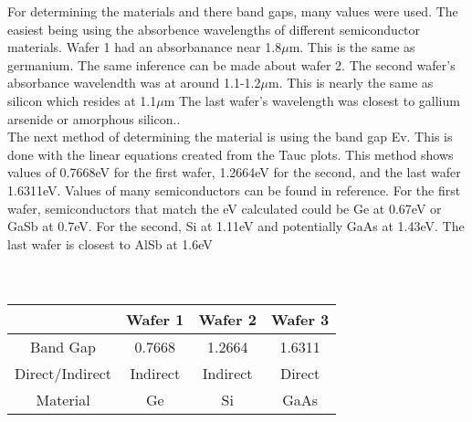 \documentclass[10pt,a4paper]{article}
\begin{document}
\begin{indentPar}{1cm}
\begin{figure}[H]
     \end{figure}
    
For determining the materials and there band gaps, many values were used. The easiest being using the absorbence wavelengths of different semiconductor materials. Wafer 1 had an absorbanance near 1.8$\mu$m. This is the same as germanium. The same inference can be made about wafer 2. The second wafer's absorbance wavelendth was at around 1.1-1.2$\mu$m. This is nearly the same as silicon which resides at 1.1$\mu$m The last wafer's wavelength was closest to gallium arsenide or amorphous silicon.\cite{semi}.\\
The next method of determining the material is using the band gap Ev. This is done with the linear equations created from the Tauc plots. This method shows values of 0.7668eV for the first wafer, 1.2664eV for the second, and the last wafer 1.6311eV. Values of many semiconductors can be found in reference. For the first wafer, semiconductors that match the eV calculated could be Ge at 0.67eV or GaSb at 0.7eV. For the second, Si at 1.11eV and potentially GaAs at 1.43eV. The last wafer is closest to AlSb at 1.6eV \cite{book}\\
\\
\\

\centering
\begin{tabular}{ |c|c|c|c| } 
 \hline
  & Wafer 1 & Wafer 2 & Wafer 3 \\
   \hline
 Band Gap & 0.7668 & 1.2664  & 1.6311 \\ 
 Direct/Indirect & Indirect & Indirect & Direct \\
 Material & Ge & Si & GaAs \\
 \hline
\end{tabular}
    
\end{indentPar}
\end{document}
